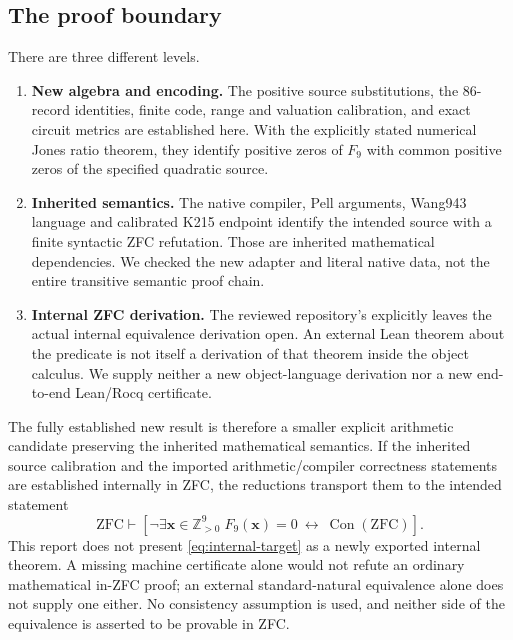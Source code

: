 \documentclass[11pt,a4paper]{article}
\theoremstyle{remark}
\newcommand{\PP}{\mathbb Z_{>0}}
\newcommand{\Con}{\operatorname{Con}}
\newcommand{\code}[1]{\texttt{\detokenize{#1}}}
\begin{document}
\subsection{The proof boundary}

There are three different levels.
\begin{enumerate}
\item \textbf{New algebra and encoding.}
The positive source substitutions, the 86-record identities, finite
code, range and valuation calibration, and exact circuit metrics are
established here. With the explicitly stated numerical Jones ratio
theorem, they identify positive zeros of \(F_9\) with common positive
zeros of the specified quadratic source.
\item \textbf{Inherited semantics.}
The native compiler, Pell arguments, Wang943 language and calibrated
K215 endpoint identify the intended source with a finite syntactic
ZFC refutation. Those are inherited mathematical dependencies. We
checked the new adapter and literal native data, not the entire
transitive semantic proof chain.
\item \textbf{Internal ZFC derivation.}
The reviewed repository's \code{OBJECT_ZFC.md} explicitly leaves
the actual internal equivalence derivation open. An external Lean
theorem about the \code{BProv} predicate is not itself a derivation
of that theorem inside the object calculus. We supply neither a new
object-language derivation nor a new end-to-end Lean/Rocq certificate.
\end{enumerate}

The fully established new result is therefore a smaller explicit
arithmetic candidate preserving the inherited mathematical semantics.
If the inherited source calibration and the imported arithmetic/compiler
correctness statements are established internally in ZFC, the
reductions transport them to the intended statement
\begin{equation}
\mathrm{ZFC}\vdash
 \left[
 \neg\exists\mathbf x\in\PP^9\;F_9(\mathbf x)=0
 \ \longleftrightarrow\ \Con(\mathrm{ZFC})
 \right].
\label{eq:internal-target}
\end{equation}
This report does not present \eqref{eq:internal-target} as a newly
exported internal theorem. A missing machine certificate alone would
not refute an ordinary mathematical in-ZFC proof; an external
standard-natural equivalence alone does not supply one either.
No consistency assumption is used, and neither side of the equivalence
is asserted to be provable in ZFC.
\end{document}
